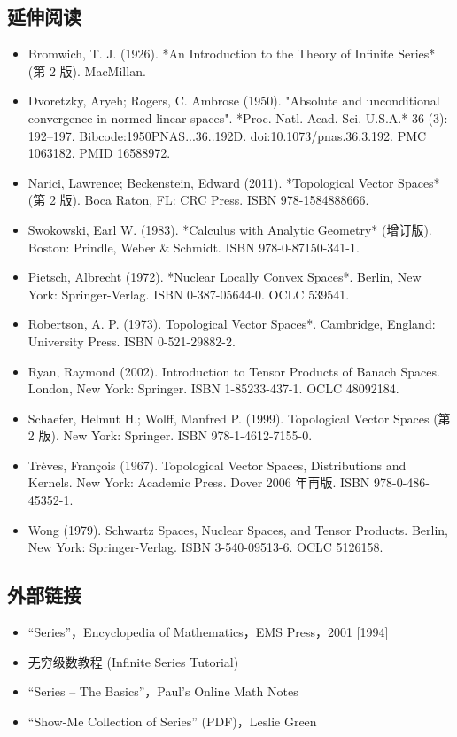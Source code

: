 \subsection{延伸阅读}
\begin{itemize}
\item Bromwich, T. J. (1926). *An Introduction to the Theory of Infinite Series* (第 2 版). MacMillan.
\item Dvoretzky, Aryeh; Rogers, C. Ambrose (1950). "Absolute and unconditional convergence in normed linear spaces". *Proc. Natl. Acad. Sci. U.S.A.* 36 (3): 192–197. Bibcode:1950PNAS...36..192D. doi:10.1073/pnas.36.3.192. PMC 1063182. PMID 16588972.
\item Narici, Lawrence; Beckenstein, Edward (2011). *Topological Vector Spaces* (第 2 版). Boca Raton, FL: CRC Press. ISBN 978-1584888666.
\item Swokowski, Earl W. (1983). *Calculus with Analytic Geometry* (增订版). Boston: Prindle, Weber & Schmidt. ISBN 978-0-87150-341-1.
\item Pietsch, Albrecht (1972). *Nuclear Locally Convex Spaces*. Berlin, New York: Springer-Verlag. ISBN 0-387-05644-0. OCLC 539541.
\item Robertson, A. P. (1973). Topological Vector Spaces*. Cambridge, England: University Press. ISBN 0-521-29882-2.
\item Ryan, Raymond (2002). Introduction to Tensor Products of Banach Spaces. London, New York: Springer. ISBN 1-85233-437-1. OCLC 48092184.
\item Schaefer, Helmut H.; Wolff, Manfred P. (1999). Topological Vector Spaces (第 2 版). New York: Springer. ISBN 978-1-4612-7155-0.
\item Trèves, François (1967). Topological Vector Spaces, Distributions and Kernels. New York: Academic Press. Dover 2006 年再版. ISBN 978-0-486-45352-1.
\item Wong (1979). Schwartz Spaces, Nuclear Spaces, and Tensor Products. Berlin, New York: Springer-Verlag. ISBN 3-540-09513-6. OCLC 5126158.
\end{itemize}
\subsection{外部链接}
\begin{itemize}
\item “Series”，Encyclopedia of Mathematics，EMS Press，2001 [1994]
\item 无穷级数教程 (Infinite Series Tutorial)
\item “Series – The Basics”，Paul's Online Math Notes
\item “Show-Me Collection of Series” (PDF)，Leslie Green
\end{itemize}
